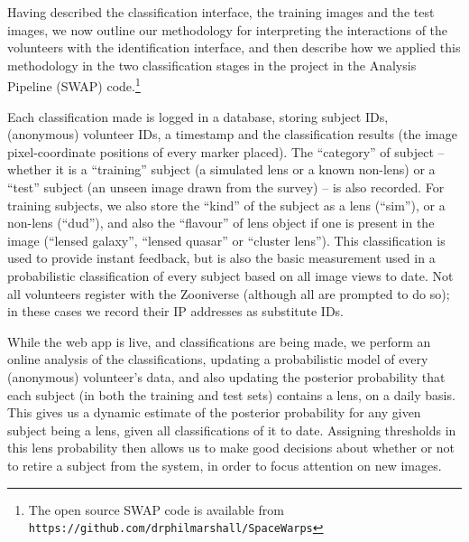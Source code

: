 \documentclass[useAMS,usenatbib,a4paper]{mn2e}
\begin{document}
Having described the classification interface, the training images and the
test images,  we now outline our methodology for interpreting the interactions
of the volunteers with the identification interface, and then describe how we
applied this methodology in the two classification stages in the \cfhtls
project in the \SW Analysis Pipeline (SWAP) code.\footnote{The open source
SWAP code is available from
\texttt{https://github.com/drphilmarshall/SpaceWarps}}

Each classification made is logged in a database, storing subject IDs,
(anonymous) volunteer IDs, a timestamp and the classification results (the image
pixel-coordinate positions of every marker placed).  The ``category'' of subject --
whether it is a ``training'' subject (a simulated lens or a known non-lens) or a
``test'' subject (an unseen image drawn from the survey) -- is also recorded.
For training subjects, we also store the ``kind'' of the subject as
a lens (``sim''), or a non-lens (``dud''), and also the ``flavour'' of lens
object if one is present in the image (``lensed galaxy'', ``lensed quasar'' or
``cluster lens'').  This classification is used to provide instant feedback, but
is also the basic measurement used in a probabilistic classification of every
subject based on all image views to date. Not all
volunteers register with the Zooniverse (although all are prompted to do so);
in these cases we record their IP addresses as substitute IDs.

While the \SW web app is live, and classifications are being made, we perform an
online analysis of the classifications,  updating a probabilistic model of every
(anonymous) volunteer's data, and also updating the posterior probability that
each subject (in both the training and test sets) contains a lens, on a daily
basis. This gives us a dynamic estimate of the posterior probability for  any
given  subject being a lens, given all classifications of it to date. Assigning
thresholds in this lens probability then allows us to make good decisions about
whether or not to retire a subject from the system, in order to focus attention
on new images.
\end{document}
